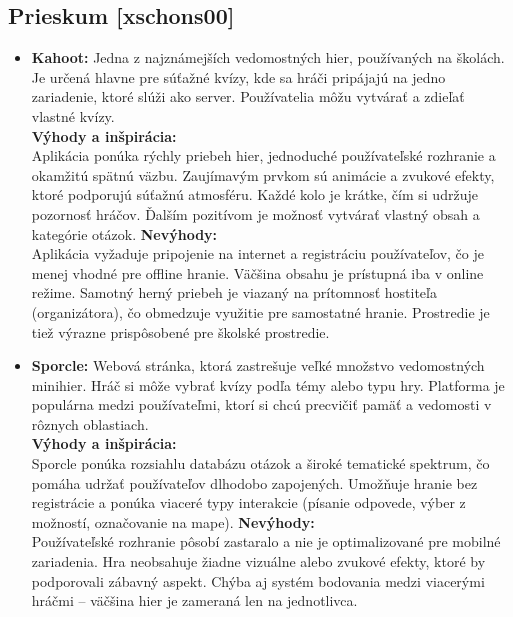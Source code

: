 \documentclass[a4paper,12pt]{article}
\begin{document}
    \subsection{Prieskum [xschons00]}
    \begin{itemize}
      \item \textbf{Kahoot:} Jedna z najznámejších vedomostných hier, používaných na školách. Je určená hlavne pre súťažné kvízy, kde sa hráči pripájajú na jedno zariadenie, ktoré slúži ako server. Používatelia môžu vytvárať a zdieľať vlastné kvízy.\\
      \newline\textbf{Výhody a inšpirácia:}\\
      Aplikácia ponúka rýchly priebeh hier, jednoduché používateľské rozhranie a okamžitú spätnú väzbu. Zaujímavým prvkom sú animácie a zvukové efekty, ktoré podporujú súťažnú atmosféru. Každé kolo je krátke, čím si udržuje pozornosť hráčov. Ďalším pozitívom je možnosť vytvárať vlastný obsah a kategórie otázok.
      \newline\textbf{Nevýhody:}\\
      Aplikácia vyžaduje pripojenie na internet a registráciu používateľov, čo je menej vhodné pre offline hranie. Väčšina obsahu je prístupná iba v online režime. Samotný herný priebeh je viazaný na prítomnosť hostiteľa (organizátora), čo obmedzuje využitie pre samostatné hranie. Prostredie je tiež výrazne prispôsobené pre školské prostredie.
    
      \vspace{1em}
      \item \textbf{Sporcle:} Webová stránka, ktorá zastrešuje veľké množstvo vedomostných minihier. Hráč si môže vybrať kvízy podľa témy alebo typu hry. Platforma je populárna medzi používateľmi, ktorí si chcú precvičiť pamäť a vedomosti v rôznych oblastiach.\\
      \newline\textbf{Výhody a inšpirácia:}\\
      Sporcle ponúka rozsiahlu databázu otázok a široké tematické spektrum, čo pomáha udržať používateľov dlhodobo zapojených. Umožňuje hranie bez registrácie a ponúka viaceré typy interakcie (písanie odpovede, výber z možností, označovanie na mape).
      \newline\textbf{Nevýhody:}\\
      Používateľské rozhranie pôsobí zastaralo a nie je optimalizované pre mobilné zariadenia. Hra neobsahuje žiadne vizuálne alebo zvukové efekty, ktoré by podporovali zábavný aspekt. Chýba aj systém bodovania medzi viacerými hráčmi – väčšina hier je zameraná len na jednotlivca.
    \end{itemize}
    
\end{document}
